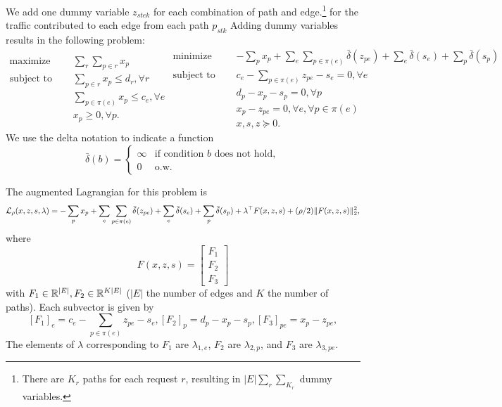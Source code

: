 \documentclass[11pt]{article}
\begin{document}
We add one dummy variable $z_{stek}$ for each combination of path and edge.\footnote{
There are $K_r$ paths for each request $r$, resulting in
$|E|\sum_r\sum_{K_r}$ dummy variables.}
for the traffic contributed to each edge from each path $p_{stk}$
Adding dummy variables results in the following problem:
\begin{equation}
\label{eqn:network-opt-sep}
\begin{aligned}
\textrm{maximize } \quad & \sum_r \sum_{p\in r} x_p\\
\textrm{subject to } \quad
&\sum_{p \in r}x_p \le d_r, \forall r\\
&\sum_{p\in\pi(e)} x_p \le c_e, \forall e\\
& x_p \geq 0, \forall p.
\end{aligned}
\begin{aligned}
\textrm{minimize } \quad & -\sum_p x_p
    + \sum_e\sum_{p \in \pi(e)} \bar\delta(z_{pe})
    + \sum_e \bar\delta(s_{e}) + \sum_p \bar\delta(s_p)\\
\textrm{subject to } \quad &c_e - \sum_{p\in\pi(e)}z_{pe} - s_{e} = 0, \forall e\\
& d_p - x_p - s_p = 0, \forall p\\
&x_p - z_{pe} = 0, \forall e, \forall p \in \pi(e)\\
&x,s,z \succeq 0.
\end{aligned}
\end{equation}
We use the delta notation to indicate a function
$$
\bar\delta(b) = \begin{cases}
    \infty & \textrm{if condition } b \textrm{ does not hold},\\
    0 & \textrm{o.w.}
\end{cases}
$$


The augmented Lagrangian for this problem is
\begin{equation}
    \label{eqn:network-lagrangian}
    \mathcal{L}_\rho(x,z,s,\lambda) =-\sum_p x_p + \sum_e\sum_{p\in\pi(e)} \bar\delta(z_{pe})
        + \sum_{e} \bar\delta(s_{e})
        + \sum_{p} \bar\delta(s_{p})
        + \lambda^\top F(x,z,s)
        + (\rho/2)\| F(x,z,s) \|_2^2,
\end{equation}
where
$$F(x,z,s) =
\begin{bmatrix}
F_1 \\
F_2 \\
F_3
\end{bmatrix}
$$
with $F_1 \in \mathbb{R}^{|E|}, F_2\in\mathbb{R}^{K|E|}$
($|E|$ the number of edges and $K$ the number of paths).
Each subvector is given by
$$
    [F_1]_e = c_e - \sum_{p\in\pi(e)}z_{pe} - s_{e},
    [F_2]_{p} = d_p - x_p - s_p,
    [F_3]_{pe} = x_p - z_{pe},
$$
The elements of $\lambda$ corresponding to $F_1$ are $\lambda_{1,e}$,
$F_2$ are $\lambda_{2,p}$, and $F_3$ are $\lambda_{3,pe}$.
\end{document}
